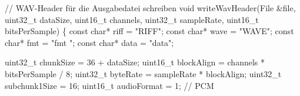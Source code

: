 \documentclass[
  ngerman,
  letterpaper,
  DIV=11]{scrreprt}
\newenvironment{Shaded}{\begin{snugshade}}{\end{snugshade}}
\newcommand{\AttributeTok}[1]{\textcolor[rgb]{0.40,0.45,0.13}{#1}}
\newcommand{\CommentTok}[1]{\textcolor[rgb]{0.37,0.37,0.37}{#1}}
\newcommand{\DataTypeTok}[1]{\textcolor[rgb]{0.68,0.00,0.00}{#1}}
\newcommand{\DecValTok}[1]{\textcolor[rgb]{0.68,0.00,0.00}{#1}}
\newcommand{\NormalTok}[1]{\textcolor[rgb]{0.00,0.23,0.31}{#1}}
\newcommand{\OperatorTok}[1]{\textcolor[rgb]{0.37,0.37,0.37}{#1}}
\newcommand{\StringTok}[1]{\textcolor[rgb]{0.13,0.47,0.30}{#1}}
\begin{document}
\begin{Shaded}
\begin{Highlighting}[]
\CommentTok{// WAV{-}Header für die Ausgabedatei schreiben}
\DataTypeTok{void}\NormalTok{ writeWavHeader}\OperatorTok{(}\NormalTok{File }\OperatorTok{\&}\NormalTok{file}\OperatorTok{,} \DataTypeTok{uint32\_t}\NormalTok{ dataSize}\OperatorTok{,} \DataTypeTok{uint16\_t}\NormalTok{ channels}\OperatorTok{,} 
\DataTypeTok{uint32\_t}\NormalTok{ sampleRate}\OperatorTok{,} \DataTypeTok{uint16\_t}\NormalTok{ bitsPerSample}\OperatorTok{)} \OperatorTok{\{}
  \AttributeTok{const} \DataTypeTok{char}\OperatorTok{*}\NormalTok{ riff }\OperatorTok{=} \StringTok{"RIFF"}\OperatorTok{;}
  \AttributeTok{const} \DataTypeTok{char}\OperatorTok{*}\NormalTok{ wave }\OperatorTok{=} \StringTok{"WAVE"}\OperatorTok{;}
  \AttributeTok{const} \DataTypeTok{char}\OperatorTok{*}\NormalTok{ fmt  }\OperatorTok{=} \StringTok{"fmt "}\OperatorTok{;}
  \AttributeTok{const} \DataTypeTok{char}\OperatorTok{*}\NormalTok{ data }\OperatorTok{=} \StringTok{"data"}\OperatorTok{;}

  \DataTypeTok{uint32\_t}\NormalTok{ chunkSize }\OperatorTok{=} \DecValTok{36} \OperatorTok{+}\NormalTok{ dataSize}\OperatorTok{;}
  \DataTypeTok{uint16\_t}\NormalTok{ blockAlign }\OperatorTok{=}\NormalTok{ channels }\OperatorTok{*}\NormalTok{ bitsPerSample }\OperatorTok{/} \DecValTok{8}\OperatorTok{;}
  \DataTypeTok{uint32\_t}\NormalTok{ byteRate }\OperatorTok{=}\NormalTok{ sampleRate }\OperatorTok{*}\NormalTok{ blockAlign}\OperatorTok{;}
  \DataTypeTok{uint32\_t}\NormalTok{ subchunk1Size }\OperatorTok{=} \DecValTok{16}\OperatorTok{;}
  \DataTypeTok{uint16\_t}\NormalTok{ audioFormat }\OperatorTok{=} \DecValTok{1}\OperatorTok{;} \CommentTok{// PCM}


\end{Highlighting}
\end{Shaded}
\end{document}
